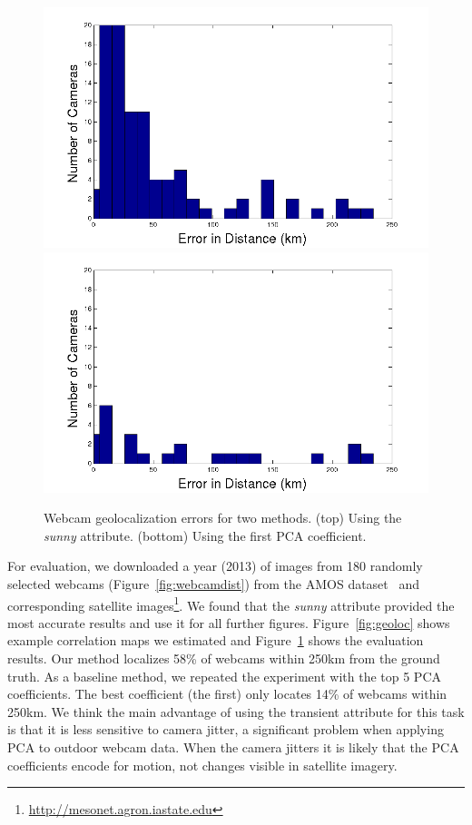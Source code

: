 \documentclass[10pt,twocolumn,letterpaper]{article}
\newcommand{\figref}[1]{Figure~\ref{fig:#1}}
\begin{document}
\begin{figure}[t]
  \centering
  \includegraphics[width=.98\linewidth, trim= 20mm 0mm 20mm 0mm]{figs/geoloc/tran_errors}
  \includegraphics[width=.98\linewidth, trim= 20mm 0mm 20mm 0mm]{figs/geoloc/pca_errors}
  \caption{Webcam geolocalization errors for two methods. (top)
    Using the \textit{sunny} attribute. (bottom)
    Using the first PCA coefficient.}
  \label{fig:locerror}
\end{figure}

For evaluation, we downloaded a year (2013) of images from 180
randomly selected webcams (\figref{webcamdist}) from the AMOS
dataset~\cite{jacobs07amos} and corresponding satellite
images\footnote{\url{http://mesonet.agron.iastate.edu}}.  We found
that the \textit{sunny} attribute provided the most accurate results
and use it for all further figures. \figref{geoloc} shows example 
correlation maps we estimated and \figref{locerror}
shows the evaluation results. Our method localizes 58\% of webcams
within 250km from the ground truth. As a baseline method, we repeated
the experiment with the top 5 PCA coefficients. The best coefficient
(the first) only locates 14\% of webcams within 250km. We think
the main advantage of using the transient attribute for this task is
that it is less sensitive to camera jitter, a significant problem when
applying PCA to outdoor webcam data. When the camera jitters it is
likely that the PCA coefficients encode for motion, not changes
visible in satellite imagery.
\end{document}
